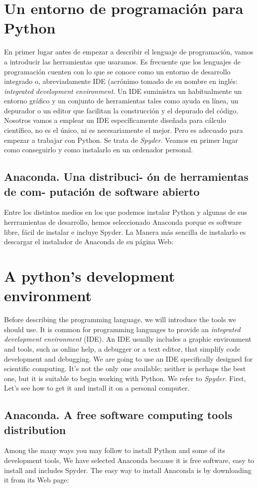 \begin{paracol}{2}
\section{Un entorno de programación para Python}
En primer lugar antes de empezar a describir el lenguaje de programación, vamos a introducir las herramientas  que usaramos. Es frecuente que los lenguajes de programación cuenten con lo que se conoce como un entorno de desarrollo integrado o, abreviadamente IDE (acrónimo tomado de su nombre en inglés: \emph{integrated development environment}. Un IDE suministra un habitualmente un entorno gráfico y un conjunto de herramientas tales como ayuda en línea, un depurador o un editor que facilitan la construcción y el depurado del código. Nosotros vamos a emplear un IDE específicamente diseñada para cálculo científico, no es el único, ni es necesariamente el mejor. Pero es adecuado para empezar a trabajar con Python. Se trata de \emph{Spyder}. Veamos en primer lugar como conseguirlo y como instalarlo en un ordenador personal.

\subsection{Anaconda. Una distribuci- ón de herramientas de com- putación de software abierto}
Entre los distintos medios en los que podemos instalar Python y algunas de sus herrramientas de desarrollo, hemos seleccionado Anaconda porque es software libre, fácil de instalar e incluye Spyder. La Manera más sencilla de instalarlo es descargar el instalador de Anaconda de su página Web: 
\switchcolumn
\section{A python's development environment}
Before describing the programming language, we will introduce the tools we should use. It is common for programming languages to provide an \emph{integrated development environment} (IDE). An IDE usually includes a graphic environment and tools, such as online help,  a debugger or a text editor, that simplify code development and debugging. We are going to use an IDE specifically designed for scientific computing. It's not the only one available; neither is perhaps the best one, but it is suitable to begin working with Python. We refer to \emph{Spyder}. First, Let's see how to get it and install it on a personal computer.

\subsection{Anaconda. A free software computing tools distribution}
Among the many ways you may follow to install Python and some of its development tools, We have selected Anaconda because it is free software, easy to install and includes Spyder. The easy way to install Anaconda is by downloading it from its Web page:  
\end{paracol}
